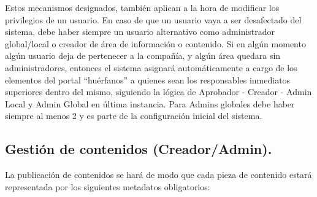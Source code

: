 Estos mecanismos designados, también aplican a la hora de modificar los privilegios de un usuario. En caso de que un usuario vaya a ser desafectado del sistema, debe haber siempre un usuario alternativo como administrador global/local o creador de área de información o contenido. Si en algún momento algún usuario deja de pertenecer a la compañía, y algún área quedara sin administradores, entonces el sistema asignará automáticamente a cargo de los elementos del portal “huérfanos” a quienes sean los responsables inmediatos superiores dentro del mismo, siguiendo la lógica de Aprobador - Creador - Admin Local y Admin Global en última instancia. Para Admins globales debe haber siempre al menos 2 y es parte de la configuración inicial del sistema.

\subsection{Gestión de contenidos (Creador/Admin).}
\label{usecases:contentadmin}
La publicación de contenidos se hará de modo que cada pieza de contenido estará representada por los siguientes metadatos obligatorios:

